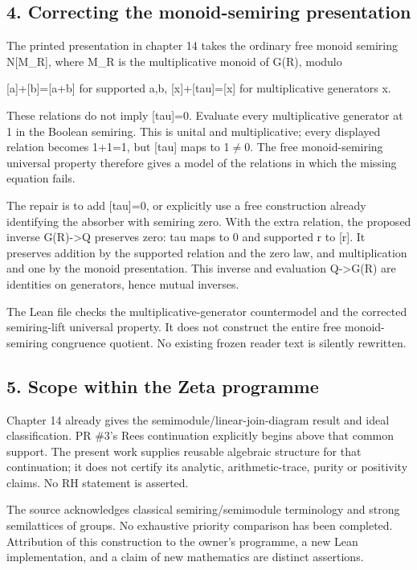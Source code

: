 \subsection{4. Correcting the monoid-semiring
presentation}\label{InheritedStructuralStage:correcting-the-monoid-semiring-presentation}

The printed presentation in chapter 14 takes the ordinary free monoid
semiring N{[}M\_R{]}, where M\_R is the multiplicative monoid of G(R),
modulo

{[}a{]}+{[}b{]}={[}a+b{]} for supported a,b, {[}x{]}+{[}tau{]}={[}x{]}
for multiplicative generators x.

These relations do not imply {[}tau{]}=0. Evaluate every multiplicative
generator at 1 in the Boolean semiring. This is unital and
multiplicative; every displayed relation becomes 1+1=1, but {[}tau{]}
maps to 1\ensuremath{\ne}0. The free monoid-semiring universal property therefore gives
a model of the relations in which the missing equation fails.

The repair is to add {[}tau{]}=0, or explicitly use a free construction
already identifying the absorber with semiring zero. With the extra
relation, the proposed inverse G(R)-\textgreater Q preserves zero: tau
maps to 0 and supported r to {[}r{]}. It preserves addition by the
supported relation and the zero law, and multiplication and one by the
monoid presentation. This inverse and evaluation Q-\textgreater G(R) are
identities on generators, hence mutual inverses.

The Lean file checks the multiplicative-generator countermodel and the
corrected semiring-lift universal property. It does not construct the
entire free monoid-semiring congruence quotient. No existing frozen
reader text is silently rewritten.

\subsection{5. Scope within the Zeta
programme}\label{InheritedStructuralStage:scope-within-the-zeta-programme}

Chapter 14 already gives the semimodule/linear-join-diagram result and
ideal classification. PR \#3's Rees continuation explicitly begins above
that common support. The present work supplies reusable algebraic
structure for that continuation; it does not certify its analytic,
arithmetic-trace, purity or positivity claims. No RH statement is
asserted.

The source acknowledges classical semiring/semimodule terminology and
strong semilattices of groups. No exhaustive priority comparison has
been completed. Attribution of this construction to the owner's
programme, a new Lean implementation, and a claim of new mathematics are
distinct assertions.

